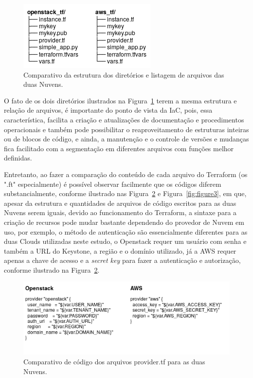 \documentclass[12pt]{article}
\begin{document}
	\begin{figure}[ht]
		\centering
		\includegraphics[width=0.42\linewidth]{figuras/Figure3a.png}
		\caption{Comparativo da estrutura dos diretórios e listagem de arquivos das duas Nuvens.}
		\label{fig:figure3a}
	\end{figure}
	
	O fato de os dois diretórios ilustrados na Figura~\ref{fig:figure3a} terem a mesma estrutura e relação de arquivos, é importante do ponto de vista da IaC, pois, essa característica, facilita a criação e atualizações de documentação e procedimentos operacionais e também pode possibilitar o reaproveitamento de estruturas inteiras ou de blocos de código, e ainda, a manutenção e o controle de versões e mudanças fica facilitado com a segmentação em diferentes arquivos com funções melhor definidas.  
	
	Entretanto, ao fazer a comparação do conteúdo de cada arquivo do Terraform (os ".ft" especialmente) é possível observar facilmente que os códigos diferem substancialmente, conforme ilustrado nas Figura~\ref{fig:figure3b} e Figura~\ref{fig:figure3}, em que, apesar da estrutura e quantidades de arquivos de código escritos para as duas Nuvens serem iguais, devido ao funcionamento do Terraform, a sintaxe para a criação de recursos pode mudar bastante dependendo do provedor de Nuvem em uso, por exemplo, o método de autenticação são essencialmente diferentes para as duas Clouds utilizadas neste estudo, o Openstack requer um usuário com senha e também a URL do Keystone, a região e o domínio utilizado, já a AWS requer apenas a chave de acesso e a \textit{secret key} para fazer a autenticação e autorização, conforme ilustrado na Figura~\ref{fig:figure3b}. 
		
	\begin{figure}[H]
		\centering
		\includegraphics[width=0.8\linewidth]{figuras/Figure3b.png}
		\caption{Comparativo de código dos arquivos provider.tf para as duas Nuvens.}
		\label{fig:figure3b}
	\end{figure}
	
\end{document}
